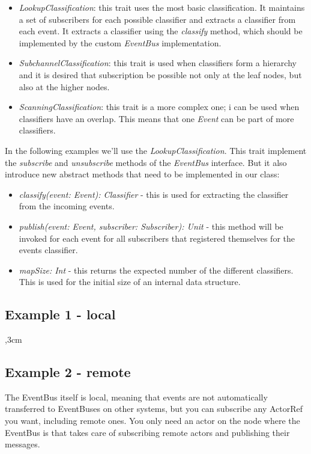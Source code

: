\documentclass{article}
\begin{document}
\begin{itemize}
\item \textit{LookupClassification}: this trait uses the most basic classification. It maintains a set of subscribers for each possible classifier and extracts a classifier from each event. It extracts a classifier using the \textit{classify} method, which should be implemented by the custom \textit{EventBus} implementation.
\item \textit{SubchannelClassification}: this trait is used when classifiers form a hierarchy and it is desired that subscription be possible not only at the leaf nodes, but also at the higher nodes.
\item \textit{ScanningClassification}: this trait is a more complex one; i can be used when classifiers have an overlap. This means that one \textit{Event} can be part of more classifiers.
\end{itemize}
In the following examples we'll use the \textit{LookupClassification}. This trait implement the \textit{subscribe} and \textit{unsubscribe} methods of the \textit{EventBus} interface. But it also introduce new abstract methods that need to be implemented in our class:
\begin{itemize}
\item \textit{classify(event: Event): Classifier} - this is used for extracting the classifier from the incoming events.
\item \textit{publish(event: Event, subscriber: Subscriber): Unit} - this method will be invoked for each event for all subscribers that registered themselves for the events classifier.
\item \textit{mapSize: Int} - this returns the expected number of the different classifiers. This is used for the initial size of an internal data structure.
\end{itemize}

\subsection{Example 1 - local}





,3cm

\subsection{Example 2 - remote}
The EventBus itself is local, meaning that events are not automatically transferred to EventBuses on other systems, but you can subscribe any ActorRef you want, including remote ones. You only need an actor on the node where the EventBus is that takes care of subscribing remote actors and publishing their messages.
\end{document}
